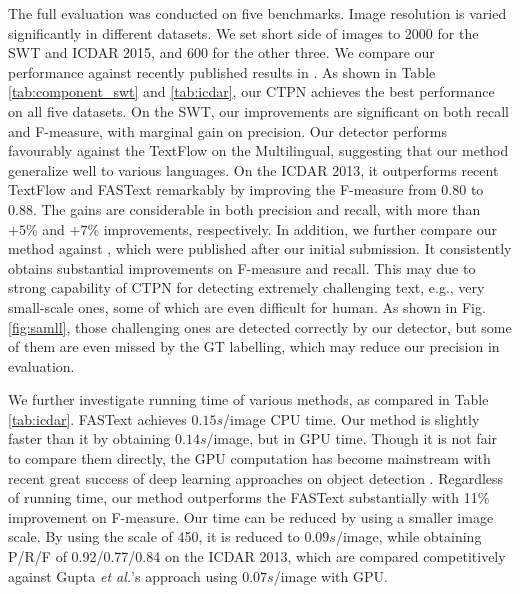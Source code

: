 \documentclass[runningheads]{llncs}
\begin{document}
 
The full evaluation was conducted on five benchmarks. Image resolution  is varied significantly in different datasets. We set short side of images to 2000 for the SWT and ICDAR 2015, and 600 for the other three. We compare our performance against recently published results in \cite{Busta2015,Tian2015,Zhang2015}. As shown in Table \ref{tab:component_swt} and \ref{tab:icdar}, our CTPN achieves the best performance on all five datasets. On the SWT, our improvements  are  significant on both recall and F-measure, with  marginal gain on precision. Our detector performs favourably against the TextFlow on the Multilingual, suggesting that our method generalize well to various languages. On the  ICDAR 2013, it outperforms recent TextFlow \cite{Tian2015} and FASText \cite{Busta2015} remarkably by improving the F-measure from 0.80 to 0.88. The gains are considerable in both precision and recall, with more than $+5\%$ and $+7\%$ improvements, respectively. 
 In addition, we further compare our method against \cite{Gupta2016,He2016,Zhang2016}, which were published after our initial submission. It consistently obtains substantial  improvements on F-measure and recall. 
 This may due to  strong capability of  CTPN for detecting extremely challenging text, e.g., very small-scale ones,  some of which are even difficult for human.  As shown in Fig. \ref{fig:samll}, those challenging ones are detected correctly by our detector, but some of them  are even missed by the GT labelling, which may reduce our precision in evaluation.     

 










 We further investigate running time of various  methods, as compared in Table \ref{tab:icdar}. FASText \cite{Busta2015} achieves $0.15s$/image CPU time. Our method is slightly faster than it by obtaining $0.14s$/image, but in GPU time. Though it is not fair to  compare them directly, the GPU computation has become mainstream with recent great success of deep learning approaches on object detection \cite{Ren2015,Girshick2015,Girshick2014}. Regardless of running time, our method outperforms the FASText substantially with 11\% improvement on F-measure. Our time can be reduced by using a smaller image scale. By using the scale of 450, it is reduced to $0.09s$/image, while obtaining P/R/F of 0.92/0.77/0.84 on the ICDAR 2013, which are compared competitively against Gupta \textit{et al.}'s approach \cite{Gupta2016} using $0.07s$/image with GPU.
 
\end{document}
